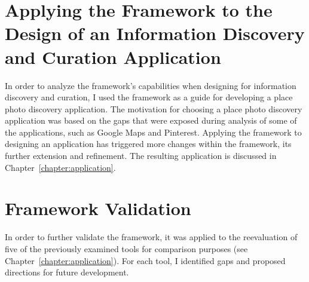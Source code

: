{\section{Applying the Framework to the Design of an Information Discovery and Curation Application}
\label{section:applying}

In order to analyze the framework's capabilities when designing for information discovery and curation, I used the framework as a guide for developing a place photo discovery application. The motivation for choosing a place photo discovery application was based on the gaps that were exposed during analysis of some of the applications, such as Google Maps and Pinterest. Applying the framework to designing an application has triggered more changes within the framework, its further extension and refinement. The resulting application is discussed in Chapter~\ref{chapter:application}.
}%

{\section{Framework Validation}
\label{section:validating}
In order to further validate the framework, it was applied to the reevaluation of five of the previously examined tools for comparison purposes (see Chapter~\ref{chapter:application}). For each tool, I identified gaps and proposed directions for future development. 
}%

